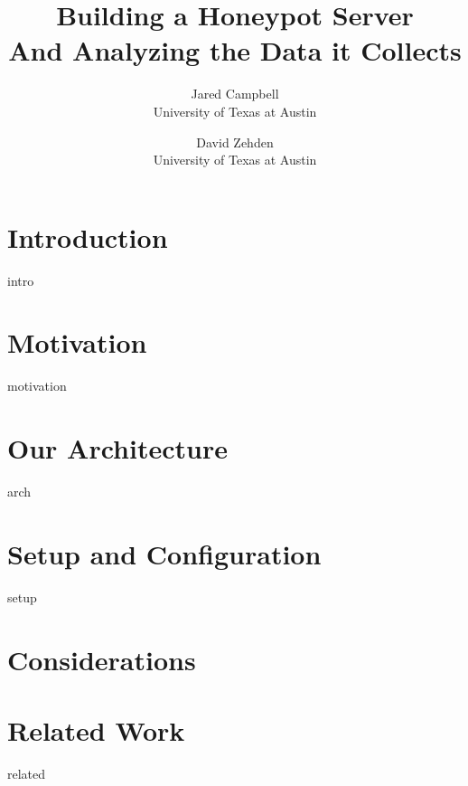 \documentclass{sig-alternate}
\newcommand{\ignore}[1]{}
\begin{document}
\title{ Building a Honeypot Server \\And Analyzing the Data it Collects}
\author{Jared Campbell\\University of Texas at Austin  \and David Zehden\\University of Texas at Austin}


\maketitle

\begin{abstract}
 
\end{abstract}

\section{Introduction}
\label{sec:intro}
 {intro}

\section{Motivation}
\label{sec:motivation}
 {motivation}

\ignore{Sometimes background is merged into motivation, and is not required separately.}

\section{Our Architecture}
\label{sec:arch}
 {arch}

\section{Setup and Configuration}
\label{sec:setup}
 {setup}

\section{Considerations}
\label{sec:considerations}


\section{Related Work}
\label{sec:related}
 {related}
\end{document}
